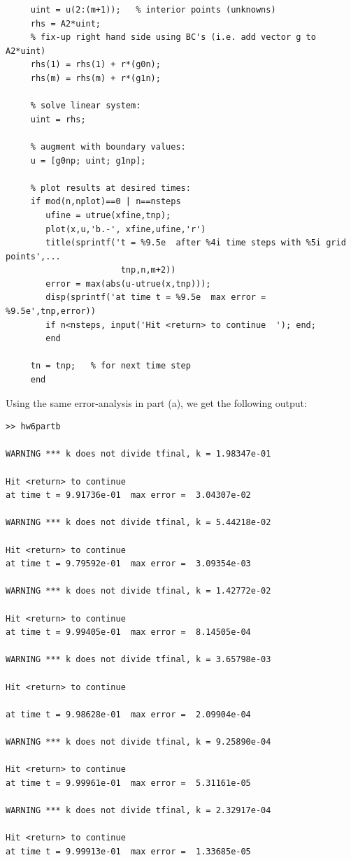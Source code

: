 \documentclass[9pt,oneside,openany]{memoir}
\begin{document}
\begin{solution}
\begin{lstlisting}[style=editor]
     % compute right hand side for linear system:
     uint = u(2:(m+1));   % interior points (unknowns)
     rhs = A2*uint;
     % fix-up right hand side using BC's (i.e. add vector g to A2*uint)
     rhs(1) = rhs(1) + r*(g0n);
     rhs(m) = rhs(m) + r*(g1n);

     % solve linear system:
     uint = rhs;

     % augment with boundary values:
     u = [g0np; uint; g1np];

     % plot results at desired times:
     if mod(n,nplot)==0 | n==nsteps
        ufine = utrue(xfine,tnp);
        plot(x,u,'b.-', xfine,ufine,'r')
        title(sprintf('t = %9.5e  after %4i time steps with %5i grid points',...
                       tnp,n,m+2))
        error = max(abs(u-utrue(x,tnp)));
        disp(sprintf('at time t = %9.5e  max error =  %9.5e',tnp,error))
        if n<nsteps, input('Hit <return> to continue  '); end;
        end

     tn = tnp;   % for next time step
     end   
\end{lstlisting}
Using the same error-analysis in part (a), we get the following output:
\begin{lstlisting}[style=console]
>> hw6partb
 
WARNING *** k does not divide tfinal, k = 1.98347e-01
 
Hit <return> to continue  
at time t = 9.91736e-01  max error =  3.04307e-02
 
WARNING *** k does not divide tfinal, k = 5.44218e-02
 
Hit <return> to continue  
at time t = 9.79592e-01  max error =  3.09354e-03
 
WARNING *** k does not divide tfinal, k = 1.42772e-02
 
Hit <return> to continue  
at time t = 9.99405e-01  max error =  8.14505e-04
 
WARNING *** k does not divide tfinal, k = 3.65798e-03
 
Hit <return> to continue  

at time t = 9.98628e-01  max error =  2.09904e-04
 
WARNING *** k does not divide tfinal, k = 9.25890e-04
 
Hit <return> to continue  
at time t = 9.99961e-01  max error =  5.31161e-05
 
WARNING *** k does not divide tfinal, k = 2.32917e-04
 
Hit <return> to continue  
at time t = 9.99913e-01  max error =  1.33685e-05
 

\end{lstlisting}
\end{solution}
\end{document}
